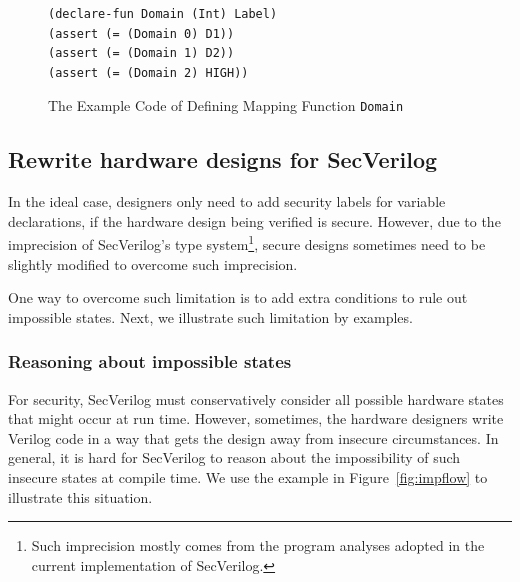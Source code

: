 \documentclass [12pt, oneside, a4paper]{article}
\newcommand{\code}[1]{\texttt{#1}}
\begin{document}
{\begin{figure}
\centering
\begin{minipage}{.8\linewidth}
\begin{lstlisting}[language=z3]
(declare-fun Domain (Int) Label)
(assert (= (Domain 0) D1))
(assert (= (Domain 1) D2))
(assert (= (Domain 2) HIGH))
\end{lstlisting}
\end{minipage}
\caption{The Example Code of Defining Mapping Function \code{Domain}}
\label{fig:domaindef}
\end{figure}
\subsection{Rewrite hardware designs for SecVerilog}

In the ideal case, designers only need to add security labels for
variable declarations, if the hardware design being verified is
secure. However, due to the imprecision of SecVerilog's type
system\footnote{Such imprecision mostly comes from the program
analyses adopted in the current implementation of SecVerilog.}, secure
designs sometimes need to be slightly modified to overcome such
imprecision.
 
One way to overcome such limitation is to add extra conditions to rule
out impossible states. Next, we illustrate such limitation by
examples.

\subsubsection{Reasoning about impossible states}

For security, SecVerilog must conservatively consider all possible
hardware states that might occur at run time. However, sometimes, the
hardware designers write Verilog code in a way that gets the design
away from insecure circumstances. In general, it is hard for
SecVerilog to reason about the impossibility of such insecure states
at compile time. We use the example in Figure~\ref{fig:impflow} to
illustrate this situation.

}
\end{document}
